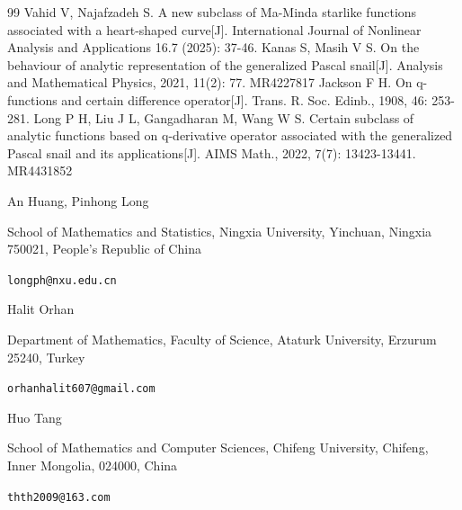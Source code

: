 \documentclass[11pt,twoside, reqno]{article}
\theoremstyle{definition}
\begin{document}
\begin{thebibliography}{99}
	   Vahid V, Najafzadeh S. A new subclass of Ma-Minda starlike functions associated with a heart-shaped curve[J]. International Journal of Nonlinear Analysis and Applications 16.7 (2025): 37-46.
        Kanas S, Masih V S. On the behaviour of analytic representation of the generalized Pascal snail[J]. Analysis and Mathematical Physics, 2021, 11(2): 77. MR4227817
        Jackson F H. On q-functions and certain difference operator[J]. Trans. R. Soc. Edinb., 1908, 46: 253-281.
        Long P H, Liu J L, Gangadharan M, Wang W S. Certain subclass of analytic functions based on q-derivative operator associated with the generalized Pascal snail and its applications[J]. AIMS Math., 2022, 7(7): 13423-13441. MR4431852




\end{thebibliography}
\bigskip

\noindent An Huang, Pinhong Long

\medskip

\noindent School of Mathematics and Statistics, Ningxia
University, Yinchuan, Ningxia 750021, People's Republic of China

\smallskip

 \texttt{longph@nxu.edu.cn}

\bigskip

\noindent Halit Orhan

\medskip

\noindent Department of Mathematics, Faculty of Science,  Ataturk University, Erzurum 25240, Turkey

\smallskip

 \texttt{orhanhalit607@gmail.com}  


\bigskip

\noindent Huo Tang

\medskip

\noindent School of Mathematics and Computer Sciences, Chifeng University, Chifeng, Inner Mongolia, 024000, China

\smallskip

 \texttt{thth2009@163.com}
\end{document}
